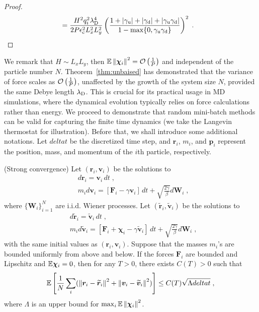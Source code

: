 \begin{proof}
\begin{align*}
    &= \frac{ H^2q_i^2\lambda_{\mathrm{D}}^4}{2P\epsilon_{\mathrm{c}}^2 L_x^2L_y^2}\left( \frac{1+\left\lvert\gamma_{\mathrm{u}}\right\rvert+\left\lvert\gamma_{\mathrm{d}}\right\rvert+\left\lvert\gamma_{\mathrm{u}}\gamma_{\mathrm{d}}\right\rvert}{1-\max\{0,\gamma_{\mathrm{u}}\gamma_{\mathrm{d}}\}}\right)^2\;.
\end{align*}
\end{proof}
We remark that $H\sim L_xL_y$, then $	\mathbb{E}\left\lVert\boldsymbol{\chi}_{i}\right\rVert^2=\mathcal{O}\left(\frac{1}{P}\right)$ and independent of the particle number $N$.
Theorem~\ref{thm:unbaised} has demonstrated that the variance of force scales as $\mathcal{O}\left(\frac{1}{P}\right)$, unaffected by the growth of the system size $N$, provided the same   Debye length $\lambda_{\mathrm{D}}$. 
This is crucial for its practical usage in MD simulations, where the dynamical evolution typically relies on force calculations rather than energy. 
We proceed to demonstrate  
that random mini-batch methods can be valid for capturing the finite time dynamics
(we take the Langevin thermostat for illustration). Before that, we shall introduce  some additional notations.
Let $delta t$ be the discretized time step, and $\bm{r}_i$, $m_i$, and $\bm{p}_i$ represent the position, mass, and momentum of the $i$th particle, respectively. 
\begin{thm}(Strong convergence)
Let $(\bm{r}_i, \bm{v}_i)$ be the solutions to
\[
\begin{split}
&d\bm{r}_i=\bm{v}_i\,d t\;,\\
&m_i d\bm{v}_i=\left[\bm{F}_i-\gamma \bm{v}_i\right]\,d t+\sqrt{\frac{2\gamma}{\beta}}d \bm{W}_i\;,
\end{split}
\]
where $\{\bm{W}_i\}_{i=1}^N$ are i.i.d. Wiener processes. Let $(\widetilde{\bm{r}}_i, \widetilde{\bm{v}}_i)$ be the solutions to
\[
\begin{split}
&d \widetilde{\bm{r}}_i=\widetilde{\bm{v}}_i\,d t\;,\\
&m_i d\widetilde{\bm{v}}_i=\left[\bm{F}_i +\bm{\chi}_i-\gamma \widetilde{\bm{v}}_i\right]\,d t+\sqrt{\frac{2\gamma}{\beta}}d \bm{W}_i\;,
\end{split}
\]
with the same initial values as $(\bm{r}_i, \bm{v}_i)$. Suppose that the masses $m_i$'s are bounded uniformly from above and below.
If the forces $\bm{F}_i$ are bounded and Lipschitz and $\mathbb{E} \bm{\chi}_i=0$, then for any $T>0$, there exists $C(T)>0$ such that
\[
\mathbb{E}\left[\frac{1}{N}\sum_i (\left\lVert\bm{r}_i-\widetilde{\bm{r}}_i\right\rVert^2
+\left\lVert\bm{v}_i-\widetilde{\bm{v}}_i\right\rVert^2) \right] \leq C(T)\sqrt{\Lambda delta t}\;,
\]
where $\Lambda$ is an upper bound for $\max_i  \mathbb{E}\left\lVert\bm{\chi}_i\right\rVert^2$.
\end{thm}
